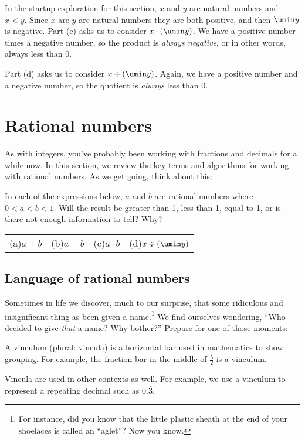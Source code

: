 In the startup exploration for this section, $x$ and $y$ are natural numbers and $x<y$. Since $x$ are $y$ are natural numbers they are both positive, and then $\umin y$ is negative. Part (c) asks us to consider $x\cdot(\umin y)$. We have a positive number times a negative number, so the product is \textit{always negative}, or in other words, always less than 0.

Part (d) asks us to consider $x\div(\umin y)$. Again, we have a positive number and a negative number, so the quotient is \textit{always} less than 0.


\section{Rational numbers}
\label{sec:rationals}

As with integers, you've probably been working with fractions and decimals for a while now. In this section, we review the key terms and algorithms for working with rational numbers. As we get going, think about this:

\begin{boxexplore}
In each of the expressions below, $a$ and $b$ are rational numbers where $0 < a < b < 1$. Will the result be greater than 1, less than 1, equal to 1, or is there not enough information to tell? Why?

\begin{tabularx}{\textwidth}{YYYY}
(a)\quad $a+b$
&
(b)\quad $a-b$
&
(c)\quad $a \cdot b$
&
(d)\quad $x \div (\umin y)$
\end{tabularx}
\end{boxexplore}

\subsection{Language of rational numbers}

Sometimes in life we discover, much to our surprise, that some ridiculous and insignificant thing as been given a name.\footnote{For instance, did you know that the little plastic sheath at the end of your shoelaces is called an ``aglet''? Now you know.} We find ourselves wondering, ``Who decided to give \textit{that} a name? Why bother?'' Prepare for one of those moments:

\begin{boxdef}[Vinculum]
A \gls{vinculum} (plural: vincula) is a horizontal bar used in mathematics to show grouping. For example, the fraction bar in the middle of $\frac{5}{2}$ is a vinculum.

Vincula are used in other contexts as well. For example, we use a vinculum to represent a repeating decimal such as $0.\overline{3}$.
\end{boxdef}

